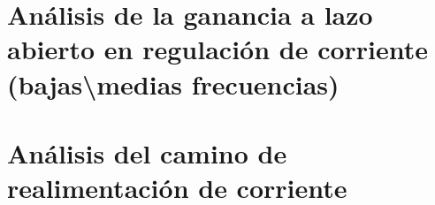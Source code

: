 \section{Análisis de la ganancia a lazo abierto en regulación de corriente (bajas\textbackslash medias frecuencias)}
\resetallcounters

\clearpage

\section{Análisis del camino de realimentación de corriente}
\resetallcounters

\clearpage


